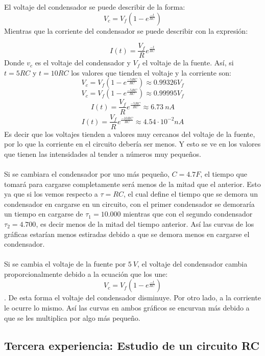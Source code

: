 \documentclass[letterpaper,11pt]{article} %
\begin{document}
El voltaje del condensador se puede describir de la forma:
$$V_c=V_f(1-e^{\frac{-t}{RC}})$$
Mientras que la corriente del condensador se puede describir con la expresión:

$$I(t)=\frac{V_{f}}{R}e^{\frac{-t}{RC}}$$
Donde $v_c$ es el voltaje del condensador y $V_f$ el voltaje de la fuente.
Así, si $t=5RC$ y $t=10RC$ los valores que tienden el voltaje y la corriente son:
$$V_c=V_f(1-e^{\frac{-5RC}{RC}})\approx 0.99326 V_f$$
$$V_c=V_f(1-e^{\frac{-5RC}{RC}})\approx 0.99995 V_f$$
$$I(t)=\frac{V_{f}}{R}e^{\frac{-5RC}{RC}}\approx 6.73~nA$$
$$I(t)=\frac{V_{f}}{R}e^{\frac{-10RC}{RC}}\approx 4.54\cdot 10^{-2}nA$$
Es decir que los voltajes tienden a valores muy cercanos del voltaje de la fuente, por lo que la corriente en el circuito debería ser menos. Y esto se ve en los valores que tienen las intensidades al tender a números muy pequeños.\\ \\

Si se cambiara el condensador por uno más pequeño, $ C=4.7F$, el tiempo que tomará para cargarse completamente será menos de la mitad que el anterior. Esto ya que si los vemos respecto a $\tau =RC$, el cual define el tiempo que se demora un condensador en cargarse en un circuito, con el primer condensador se demoraría un tiempo en cargarse de $\tau_1=10.000$ mientras que con el segundo condensador $\tau_2=4.700$, es decir menos de la mitad del tiempo anterior. Así las curvas de los gráficas estarían menos estiradas debido a que se demora menos en cargarse el condensador. \\ \\

Si se cambia el voltaje de la fuente por $5~V$, el voltaje del condensador cambia proporcionalmente debido a la ecuación que los une: $$V_c=V_f(1-e^{\frac{-t}{RC}})$$. De esta forma el voltaje del condensador disminuye. Por otro lado, a la corriente le ocurre lo mismo. Así las curvas en ambos gráficos se encurvan más debido a que se les multiplica por algo más pequeño.



\subsection{Tercera experiencia: Estudio de un circuito RC}
\end{document}
